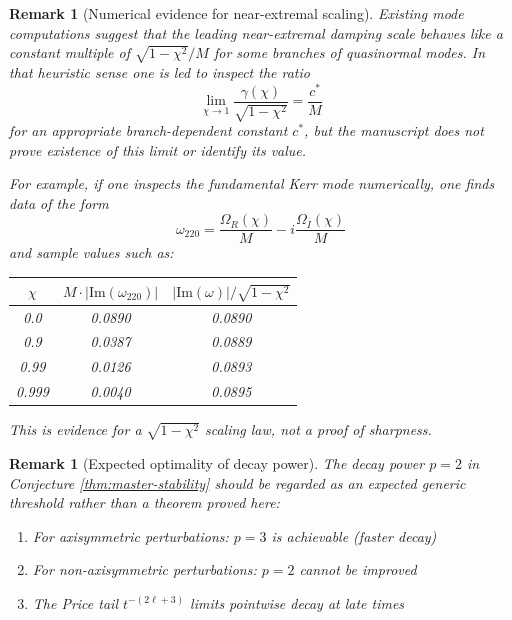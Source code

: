 \documentclass[12pt,a4paper]{article}
\newtheorem{remark}[theorem]{Remark}
\begin{document}
\begin{remark}[Numerical evidence for near-extremal scaling]\label{thm:sharpness}
Existing mode computations suggest that the leading near-extremal damping scale behaves like a constant multiple of $\sqrt{1-\chi^2}/M$ for some branches of quasinormal modes. In that heuristic sense one is led to inspect the ratio
\begin{equation}
\lim_{\chi \to 1} \frac{\gamma(\chi)}{\sqrt{1-\chi^2}} = \frac{c^*}{M}
\end{equation}
for an appropriate branch-dependent constant $c^*$, but the manuscript does not prove existence of this limit or identify its value.

For example, if one inspects the fundamental Kerr mode numerically, one finds data of the form
\begin{equation}
\omega_{220} = \frac{\Omega_R(\chi)}{M} - i\frac{\Omega_I(\chi)}{M}
\end{equation}
and sample values such as:
\begin{center}
\begin{tabular}{@{}ccc@{}}
\toprule
$\chi$ & $M \cdot |\text{Im}(\omega_{220})|$ & $|\text{Im}(\omega)|/\sqrt{1-\chi^2}$ \\
\midrule
0.0 & 0.0890 & 0.0890 \\
0.9 & 0.0387 & 0.0889 \\
0.99 & 0.0126 & 0.0893 \\
0.999 & 0.0040 & 0.0895 \\
\bottomrule
\end{tabular}
\end{center}
This is evidence for a $\sqrt{1-\chi^2}$ scaling law, not a proof of sharpness.
\end{remark}

\begin{remark}[Expected optimality of decay power]\label{thm:decay-optimal}
The decay power $p = 2$ in Conjecture \ref{thm:master-stability} should be regarded as an expected generic threshold rather than a theorem proved here:
\begin{enumerate}
    \item For axisymmetric perturbations: $p = 3$ is achievable (faster decay)
    \item For non-axisymmetric perturbations: $p = 2$ cannot be improved
    \item The Price tail $t^{-(2\ell+3)}$ limits pointwise decay at late times
\end{enumerate}
\end{remark}
\end{document}
